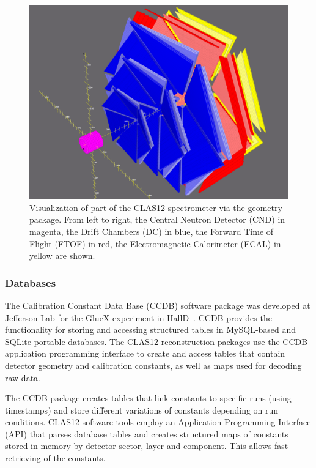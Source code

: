 \begin{figure}
\centering
\includegraphics[width=1.0\columnwidth]{reconstruction/pics/detectorview.png}
\caption{Visualization of part of the CLAS12 spectrometer via the geometry package. From left to right, the Central Neutron Detector (CND) in magenta, the Drift Chambers (DC) in blue, the Forward Time of Flight (FTOF) in red, the Electromagnetic Calorimeter (ECAL) in yellow are shown.}
\label{fig:detectorview}
\end{figure}
\subsubsection{Databases}

The Calibration Constant Data Base (CCDB) software package was developed at Jefferson Lab for the GlueX experiment
in HallD~\cite{gluex}.  CCDB provides the functionality for storing and accessing structured tables in MySQL-based and SQLite portable databases.
The CLAS12 reconstruction packages use the CCDB application programming interface to create and access
tables that contain detector geometry and calibration constants, as well as maps used for decoding raw data.

The CCDB package creates
tables that link constants to specific runs (using timestamps) and store different variations of constants depending on run
conditions. CLAS12 software tools employ an Application Programming Interface (API) that parses database tables and creates
structured maps of constants stored in  memory by detector sector, layer and component. This allows fast retrieving of the
constants.

